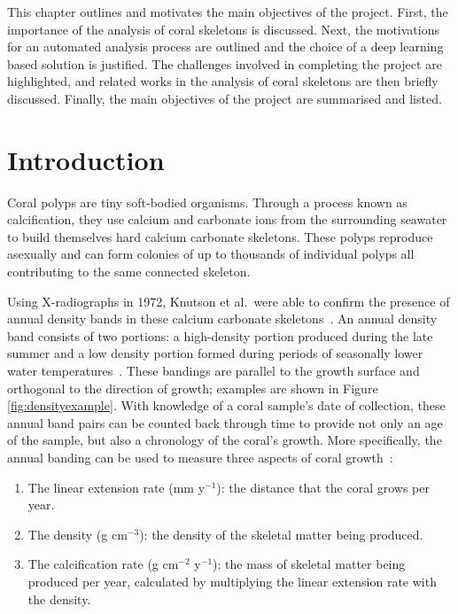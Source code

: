 This chapter outlines and motivates the main objectives of the project. First, the importance of the analysis of coral skeletons is discussed. Next, the motivations for an automated analysis process are outlined and the choice of a deep learning based solution is justified. The challenges involved in completing the project are highlighted, and related works in the analysis of coral skeletons are then briefly discussed. Finally, the main objectives of the project are summarised and listed.

\section{Introduction}

Coral polyps are tiny soft-bodied organisms. Through a process known as calcification, they use calcium and carbonate ions from the surrounding seawater to build themselves hard calcium carbonate skeletons. These polyps reproduce asexually and can form colonies of up to thousands of individual polyps all contributing to the same connected skeleton.

Using X-radiographs in 1972, Knutson et al.\ were able to confirm the presence of annual density bands in these calcium carbonate skeletons~\cite{knutson}. An annual density band consists of two portions: a high-density portion produced during the late summer and a low density portion formed during periods of seasonally lower water temperatures~\cite{highlow}. These bandings are parallel to the growth surface and orthogonal to the direction of growth; examples are shown in Figure \ref{fig:densityexample}. With knowledge of a coral sample's date of collection, these annual band pairs can be counted back through time to provide not only an age of the sample, but also a chronology of the coral's growth. More specifically, the annual banding can be used to measure three aspects of coral growth~\cite{lough2011new}:

\begin{enumerate}
    \item The linear extension rate (mm y$^{-1}$): the distance that the coral grows per year.
    \item The density (g cm$^{-3}$): the density of the skeletal matter being produced.
    \item The calcification rate (g cm$^{-2}$ y$^{-1}$): the mass of skeletal matter being produced per year, calculated by multiplying the linear extension rate with the density.
\end{enumerate}

